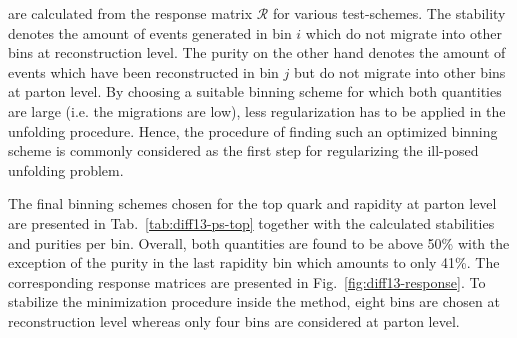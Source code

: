 are calculated from the response matrix $\mathcal{R}$ for various test-schemes. The stability denotes the amount of events generated in bin $i$ which do not migrate into other bins at reconstruction level. The purity on the other hand denotes the amount of events which have been reconstructed in bin $j$ but do not migrate into other bins at parton level. By choosing a suitable binning scheme for which both quantities are large (i.e. the migrations are low), less regularization has to be applied in the unfolding procedure. Hence, the procedure of finding such an optimized binning scheme is commonly considered as the first step for regularizing the ill-posed unfolding problem.

The final binning schemes chosen for the top quark \pt and rapidity at parton level are presented in Tab.~\ref{tab:diff13-ps-top} together with the calculated stabilities and purities per bin. Overall, both quantities are found to be above 50\% with the exception of the purity in the last rapidity bin which amounts to only 41\%. The corresponding response matrices are presented in Fig.~\ref{fig:diff13-response}. To stabilize the minimization procedure inside the \TUNFOLD method, eight bins are chosen at reconstruction level whereas only four bins are considered at parton level.




